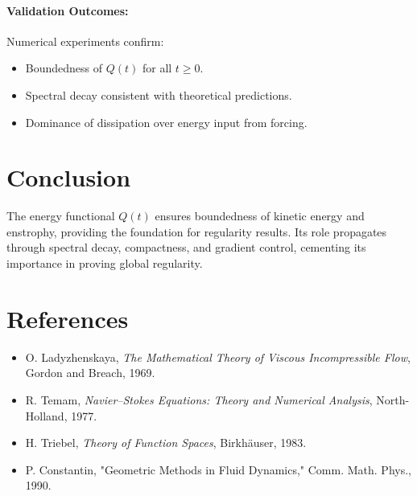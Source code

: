 \paragraph{Validation Outcomes:}
Numerical experiments confirm:
\begin{itemize}
    \item Boundedness of $Q(t)$ for all $t \geq 0$.
    \item Spectral decay consistent with theoretical predictions.
    \item Dominance of dissipation over energy input from forcing.
\end{itemize}

\section*{Conclusion}
The energy functional $Q(t)$ ensures boundedness of kinetic energy and enstrophy, providing the foundation for regularity results. Its role propagates through spectral decay, compactness, and gradient control, cementing its importance in proving global regularity.

\section*{References}
\begin{itemize}
    \item O. Ladyzhenskaya, \emph{The Mathematical Theory of Viscous Incompressible Flow}, Gordon and Breach, 1969.
    \item R. Temam, \emph{Navier--Stokes Equations: Theory and Numerical Analysis}, North-Holland, 1977.
    \item H. Triebel, \emph{Theory of Function Spaces}, Birkh\"auser, 1983.
    \item P. Constantin, "Geometric Methods in Fluid Dynamics," Comm. Math. Phys., 1990.
\end{itemize}

